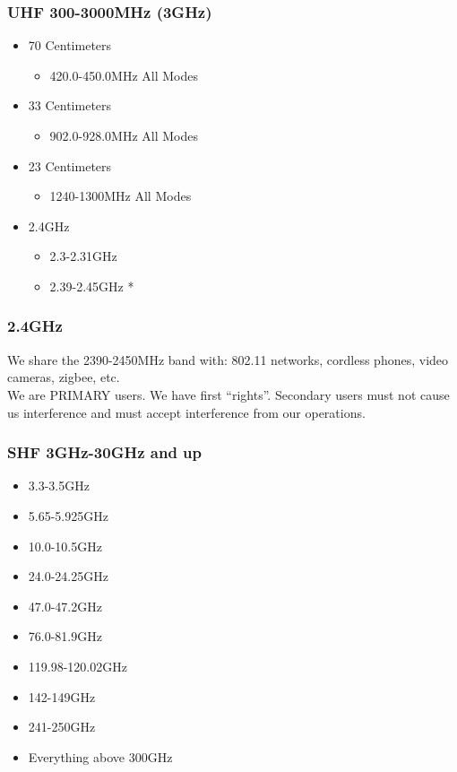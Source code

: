 \documentclass[10pt, handout]{beamer}
\begin{document}
\begin{frame}
\frametitle{UHF 300-3000MHz (3GHz)}
\begin{itemize}
\item 70 Centimeters
\begin{itemize}
\item 420.0-450.0MHz All Modes
\end{itemize}
\item 33 Centimeters
\begin{itemize}
\item 902.0-928.0MHz All Modes
\end{itemize}
\item 23 Centimeters
\begin{itemize}
\item 1240-1300MHz All Modes
\end{itemize}
\item 2.4GHz
\begin{itemize}
\item 2.3-2.31GHz
\item 2.39-2.45GHz *
\end{itemize}
\end{itemize}
\end{frame}

\begin{frame}
\frametitle{2.4GHz}
We share the 2390-2450MHz band with: 802.11 networks, cordless phones, video cameras, zigbee, etc.\ \\
We are PRIMARY users. We have first ``rights''. Secondary users must not cause us interference and must accept interference from our operations.
\end{frame}

\begin{frame}
\frametitle{SHF 3GHz-30GHz and up}
\begin{itemize}
\item 3.3-3.5GHz
\item  5.65-5.925GHz
\item  10.0-10.5GHz
\item  24.0-24.25GHz
\item  47.0-47.2GHz
\item  76.0-81.9GHz
\item  119.98-120.02GHz
\item  142-149GHz
\item  241-250GHz
\item  Everything above 300GHz
\end{itemize}
\end{frame}
\end{document}
